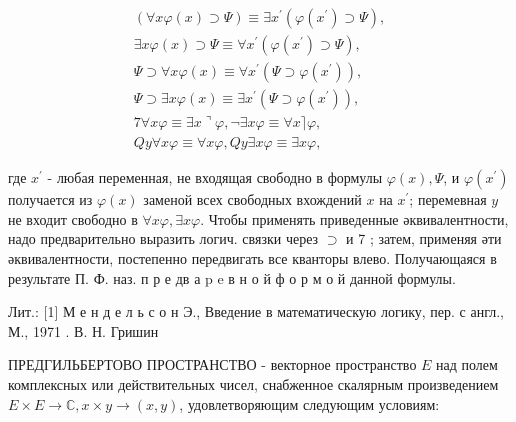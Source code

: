 \documentclass[10pt]{article}
\begin{document}
\[

\begin{gathered}

(\forall x \varphi(x) \supset \Psi) \equiv \exists x^{\prime}\left(\varphi\left(x^{\prime}\right) \supset \Psi\right), \\

\exists x \varphi(x) \supset \Psi \equiv \forall x^{\prime}\left(\varphi\left(x^{\prime}\right) \supset \Psi\right), \\

\Psi \supset \forall x \varphi(x) \equiv \forall x^{\prime}\left(\Psi \supset \varphi\left(x^{\prime}\right)\right), \\

\Psi \supset \exists x \varphi(x) \equiv \exists x^{\prime}\left(\Psi \supset \varphi\left(x^{\prime}\right)\right), \\

7 \forall x \varphi \equiv \exists x\urcorner \varphi, \neg \exists x \varphi \equiv \forall x\rceil \varphi, \\

Q y \forall x \varphi \equiv \forall x \varphi, Q y \exists x \varphi \equiv \exists x \varphi,

\end{gathered}

\]



где $x^{\prime}$ - любая переменная, не входящая свободно в формулы $\varphi(x), \Psi$, и $\varphi\left(x^{\prime}\right)$ получается из $\varphi(x)$ заменой всех свободных вхождений $x$ на $x^{\prime}$; перемевная $y$ не входит свободно в $\forall x \varphi, \exists x \varphi$. Чтобы применять приведенные әквивалентности, надо предварительно выразить логич. связки через $\supset$ и 7 ; затем, применяя әти әквивалентности, постепенно передвигать все кванторы влево. Получающаяся в результате П. Ф. наз. п р е дв а p e в н о й ф о р м о й данной формулы.



Лит.: [1] М е н д е л ь с о н Э., Введение в математическую логику, пер. с англ., М., 1971 . В. Н. Гришин



ПРЕДГИЛЬБЕРТОВО ПРОСТРАНСТВО - векторное пространство $E$ над полем комплексных или действительных чисел, снабженное скалярным произведением $E \times E \rightarrow \mathbb{C}, x \times y \rightarrow(x, y)$, удовлетворяющим следующим условиям:
\end{document}
